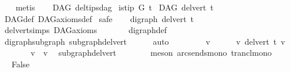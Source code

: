 \begin{isabellebody}
\ \ \isamarkupfalse%
\ metis%
\endisatagproof
{\isafoldproof}%
%
\isadelimproof
\ \isanewline
%
\endisadelimproof
\isanewline
{}\isamarkupfalse%
\ {\isacharparenleft}{\kern0pt}\ DAG{\isacharparenright}{\kern0pt}\ del{\isacharunderscore}{\kern0pt}tips{\isacharunderscore}{\kern0pt}dag{\isacharcolon}{\kern0pt}\isanewline
{}\ {\isachardoublequoteopen}is{\isacharunderscore}{\kern0pt}tip\ G\ t{\isachardoublequoteclose}\isanewline
{}\ {\isachardoublequoteopen}DAG\ {\isacharparenleft}{\kern0pt}del{\isacharunderscore}{\kern0pt}vert\ t{\isacharparenright}{\kern0pt}{\isachardoublequoteclose}\isanewline
%
\isadelimproof
\ \ %
\endisadelimproof
%
\isatagproof
{}\isamarkupfalse%
\ DAG{\isacharunderscore}{\kern0pt}def\ DAG{\isacharunderscore}{\kern0pt}axioms{\isacharunderscore}{\kern0pt}def\isanewline
{}\isamarkupfalse%
\ safe\isanewline
\ \ \isamarkupfalse%
\ {\isachardoublequoteopen}digraph\ {\isacharparenleft}{\kern0pt}del{\isacharunderscore}{\kern0pt}vert\ t{\isacharparenright}{\kern0pt}{\isachardoublequoteclose}\ \isamarkupfalse%
\ del{\isacharunderscore}{\kern0pt}vert{\isacharunderscore}{\kern0pt}simps\ DAG{\isacharunderscore}{\kern0pt}axioms\ \isanewline
\ \ \ \ \ \ digraph{\isacharunderscore}{\kern0pt}def\isanewline
\ \ \ \ \isamarkupfalse%
\ digraph{\isacharunderscore}{\kern0pt}subgraph\ subgraph{\isacharunderscore}{\kern0pt}del{\isacharunderscore}{\kern0pt}vert\isanewline
\ \ \ \ \isamarkupfalse%
\ auto\ \isanewline
{}\isamarkupfalse%
\ \isanewline
\ \ \ \ \isamarkupfalse%
\ v\isanewline
\ \ \ \ \isamarkupfalse%
\ {\isachardoublequoteopen}v\ {\isasymrightarrow}\isactrlsup {\isacharplus}{\kern0pt}\isactrlbsub del{\isacharunderscore}{\kern0pt}vert\ t\isactrlesub \ v{\isachardoublequoteclose}\isanewline
\ \ \ \ \isamarkupfalse%
\ \isamarkupfalse%
\ {\isachardoublequoteopen}v\ {\isasymrightarrow}\isactrlsup {\isacharplus}{\kern0pt}\ v{\isachardoublequoteclose}\ \isamarkupfalse%
\ subgraph{\isacharunderscore}{\kern0pt}del{\isacharunderscore}{\kern0pt}vert\isanewline
\ \ \ \ \ \ \isamarkupfalse%
\ {\isacharparenleft}{\kern0pt}meson\ arcs{\isacharunderscore}{\kern0pt}ends{\isacharunderscore}{\kern0pt}mono\ trancl{\isacharunderscore}{\kern0pt}mono{\isacharparenright}{\kern0pt}\ \isanewline
\ \ \ \ \isamarkupfalse%
\ \isamarkupfalse%
\ False\isanewline

\end{isabellebody}

